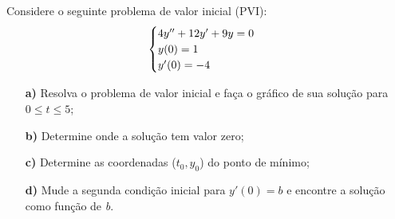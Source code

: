 \linespread{1.5}
Considere o seguinte problema de valor inicial (PVI):
\begin{equation*}
    \centering
    \begin{cases}
        4y'' + 12y' + 9y = 0\\
        y(0)= 1\\
        y'(0) = -4
    \end{cases}
\end{equation*}

\begin{itemize}
    \item[\textbf{a)}] Resolva o problema de valor inicial e faça o gráfico de sua solução para $0\leq t\leq 5$;
    \item[\textbf{b)}] Determine onde a solução tem valor zero;
    \item[\textbf{c)}] Determine as coordenadas ($t_0, y_0$) do ponto de mínimo;
    \item[\textbf{d)}] Mude a segunda condição inicial para $y'(0) = b$ e encontre a solução como função de \textit{b}.
\end{itemize}